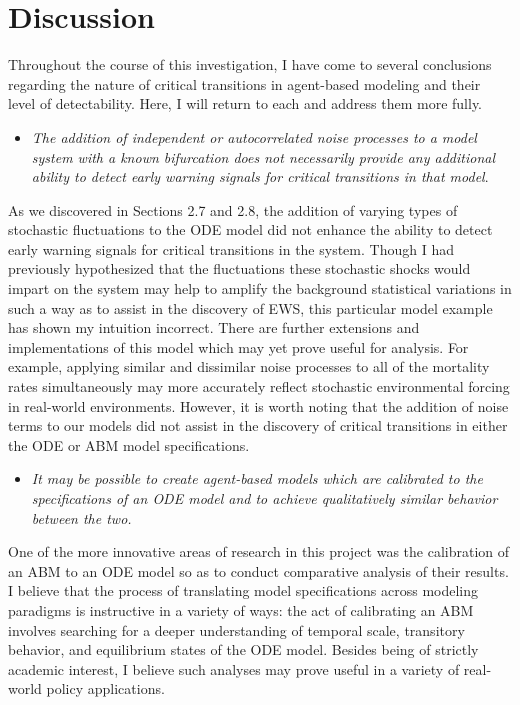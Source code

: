 \documentclass[12pt]{article}
\begin{document}
\section{Discussion}

Throughout the course of this investigation, I have come to several conclusions regarding the nature of critical transitions in agent-based modeling and their level of detectability. Here, I will return to each and address them more fully.

\begin{itemize}
	\item \emph{The addition of independent or autocorrelated noise processes to a model system with a known bifurcation does not necessarily provide any additional ability to detect early warning signals for critical transitions in that model}.
\end{itemize}

As we discovered in Sections 2.7 and 2.8, the addition of varying types of stochastic fluctuations to the ODE model did not enhance the ability to detect early warning signals for critical transitions in the system. Though I had previously hypothesized that the fluctuations these stochastic shocks would impart on the system may help to amplify the background statistical variations in such a way as to assist in the discovery of EWS, this particular model example has shown my intuition incorrect. There are further extensions and implementations of this model which may yet prove useful for analysis. For example, applying similar and dissimilar noise processes to all of the mortality rates simultaneously may more accurately reflect stochastic environmental forcing in real-world environments. However, it is worth noting that the addition of noise terms to our models did not assist in the discovery of critical transitions in either the ODE or ABM model specifications. \\

\begin{itemize}
	\item \emph{It may be possible to create agent-based models which are calibrated to the specifications of an ODE model and to achieve qualitatively similar behavior between the two.}
\end{itemize}

One of the more innovative areas of research in this project was the calibration of an ABM to an ODE model so as to conduct comparative analysis of their results. I believe that the process of translating model specifications across modeling paradigms is instructive in a variety of ways: the act of calibrating an ABM involves searching for a deeper understanding of temporal scale, transitory behavior, and equilibrium states of the ODE model. Besides being of strictly academic interest, I believe such analyses may prove useful in a variety of real-world policy applications.\\
\end{document}
